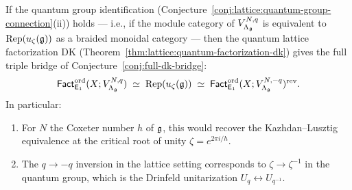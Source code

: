 \begin{conjecture}
\label{conj:lattice:dk5-quantum-bridge}
If the quantum group identification
\textup{(}Conjecture~\textup{\ref{conj:lattice:quantum-group-connection}(ii))}
holds --- i.e., if the module category of
$V_{\Lambda_{\mathfrak{g}}}^{N,q}$ is equivalent to
$\operatorname{Rep}(u_\zeta(\mathfrak{g}))$ as a braided monoidal category
--- then the quantum lattice factorization DK
\textup{(}Theorem~\textup{\ref{thm:lattice:quantum-factorization-dk})}
gives the full triple bridge of
Conjecture~\textup{\ref{conj:full-dk-bridge}}:
\begin{equation}\label{eq:lattice:triple-bridge}
\mathsf{Fact}_{\mathsf{E}_1}^{\mathrm{ord}}(X; V_{\Lambda_{\mathfrak{g}}}^{N,q})
\;\simeq\;
\operatorname{Rep}(u_\zeta(\mathfrak{g}))
\;\simeq\;
\mathsf{Fact}_{\mathsf{E}_1}^{\mathrm{ord}}(X; V_{\Lambda_{\mathfrak{g}}}^{N,-q})^{\mathrm{rev}}.
\end{equation}
In particular:
\begin{enumerate}[label=(\roman*)]
\item For $N$ the Coxeter number $h$ of $\mathfrak{g}$, this would
  recover the Kazhdan--Lusztig equivalence at the critical root of
  unity $\zeta = e^{2\pi i/h}$.
\item The $q \to -q$ inversion in the lattice setting corresponds
  to $\zeta \to \zeta^{-1}$ in the quantum group, which is the
  Drinfeld unitarization $U_q \leftrightarrow U_{q^{-1}}$.
\end{enumerate}
\end{conjecture}

